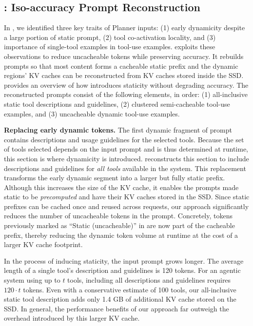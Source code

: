 \subsection{\prefill: Iso-accuracy Prompt Reconstruction} \label{sect:proposed_prefill}
\label{page:iso_accuracy}


In , we identified three key traits of Planner inputs: (1) early dynamicity despite a large portion of static prompt, (2) tool co-activation locality, and (3) importance of single-tool examples in tool-use examples. \prefill exploits these observations to reduce uncacheable tokens while preserving accuracy. It rebuilds prompts so that most content forms a cacheable static prefix and the dynamic regions' KV caches can be reconstructed from KV caches stored inside the SSD.  provides an overview of how \prefill introduces staticity without degrading accuracy. The reconstructed prompts consist of the following elements, in order: (1) all-inclusive static tool descriptions and guidelines, (2) clustered semi-cacheable tool-use examples, and (3) uncacheable dynamic tool-use examples.

{\bf Replacing early dynamic tokens.} The first dynamic fragment of prompt contains descriptions and usage guidelines for the selected tools. Because the set of tools selected depends on the input prompt and is thus determined at runtime, this section is where dynamicity is introduced. \prefill reconstructs this section to include descriptions and guidelines for \textit{all tools} available in the system. This replacement transforms the early dynamic segment into a larger but fully static prefix. Although this increases the size of the KV cache, it enables the prompts made static to be \emph{precomputed} and have their KV caches stored in the SSD. Since static prefixes can be cached once and reused across requests, our approach significantly reduces the number of uncacheable tokens in the prompt. Concretely, tokens previously marked as ``Static (uncacheable)'' in  are now part of the cacheable prefix, thereby reducing the dynamic token volume at runtime at the cost of a larger KV cache footprint.

In the process of inducing staticity, the input prompt grows longer. The average length of a single tool's description and guidelines is 120 tokens. For an agentic system using up to $t$ tools, including all descriptions and guidelines requires $120 \cdot t$ tokens. Even with a conservative estimate of 100 tools, our all-inclusive static tool description adds only 1.4 GB of additional KV cache stored on the SSD. In general, the performance benefits of our approach far outweigh the overhead introduced by this larger KV cache.


